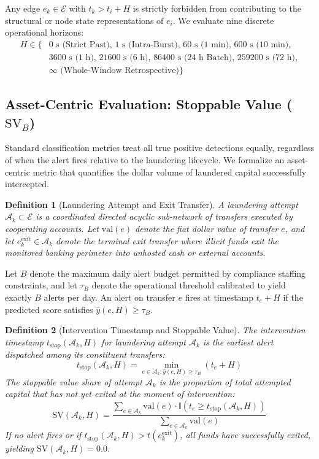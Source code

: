 \documentclass[pdflatex,sn-mathphys,Numbered]{sn-jnl}
\theoremstyle{thmstyleone}
\theoremstyle{thmstyletwo}
\theoremstyle{thmstylethree}
\newtheorem{definition}{Definition}
\begin{document}
Any edge $e_k \in \mathcal{E}$ with $t_k > t_i + H$ is strictly forbidden from contributing to the structural or node state representations of $e_i$. We evaluate nine discrete operational horizons:
\begin{align}
H \in \{&0\text{ s (Strict Past)}, \, 1\text{ s (Intra-Burst)}, \, 60\text{ s (1 min)}, \, 600\text{ s (10 min)}, \nonumber \\
        &3600\text{ s (1 h)}, \, 21600\text{ s (6 h)}, \, 86400\text{ s (24 h Batch)}, \, 259200\text{ s (72 h)}, \nonumber \\
        &\infty\text{ (Whole-Window Retrospective)}\}
\end{align}

\subsection{Asset-Centric Evaluation: Stoppable Value ($\text{SV}_B$)}
Standard classification metrics treat all true positive detections equally, regardless of when the alert fires relative to the laundering lifecycle. We formalize an asset-centric metric that quantifies the dollar volume of laundered capital successfully intercepted.

\begin{definition}[Laundering Attempt and Exit Transfer]
A laundering attempt $\mathcal{A}_k \subset \mathcal{E}$ is a coordinated directed acyclic sub-network of transfers executed by cooperating accounts. Let $\text{val}(e)$ denote the fiat dollar value of transfer $e$, and let $e_k^{\text{exit}} \in \mathcal{A}_k$ denote the terminal exit transfer where illicit funds exit the monitored banking perimeter into unhosted cash or external accounts.
\end{definition}

Let $B$ denote the maximum daily alert budget permitted by compliance staffing constraints, and let $\tau_B$ denote the operational threshold calibrated to yield exactly $B$ alerts per day. An alert on transfer $e$ fires at timestamp $t_e + H$ if the predicted score satisfies $\hat{y}(e, H) \ge \tau_B$. 

\begin{definition}[Intervention Timestamp and Stoppable Value]
The intervention timestamp $t_{\text{stop}}(\mathcal{A}_k, H)$ for laundering attempt $\mathcal{A}_k$ is the earliest alert dispatched among its constituent transfers:
\begin{equation}
t_{\text{stop}}(\mathcal{A}_k, H) = \min_{e \in \mathcal{A}_k : \hat{y}(e, H) \ge \tau_B} (t_e + H)
\end{equation}
The stoppable value share of attempt $\mathcal{A}_k$ is the proportion of total attempted capital that has not yet exited at the moment of intervention:
\begin{equation}
\text{SV}(\mathcal{A}_k, H) = \frac{\sum_{e \in \mathcal{A}_k} \text{val}(e) \cdot \mathbb{I}(t_e \ge t_{\text{stop}}(\mathcal{A}_k, H))}{\sum_{e \in \mathcal{A}_k} \text{val}(e)}
\end{equation}
If no alert fires or if $t_{\text{stop}}(\mathcal{A}_k, H) > t(e_k^{\text{exit}})$, all funds have successfully exited, yielding $\text{SV}(\mathcal{A}_k, H) = 0.0$.
\end{definition}
\end{document}
